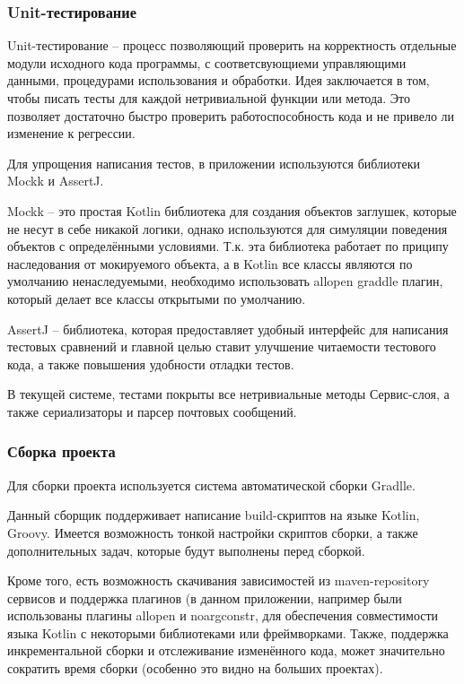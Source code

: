 \subsubsection{Unit-тестирование}\indent

Unit-тестирование – процесс позволяющий проверить на корректность отдельные модули исходного кода программы, с соответсвующиеми управляющими данными, процедурами использования и обработки. Идея заключается в том, чтобы писать тесты для каждой нетривиальной функции или метода. Это позволяет достаточно быстро проверить работоспособность кода и не привело ли изменение к регрессии.

Для упрощения написания тестов, в приложении используются библиотеки Mockk и AssertJ.

Mockk – это простая Kotlin библиотека для создания объектов заглушек, которые не несут в себе никакой логики, однако используются для симуляции поведения объектов с определёнными условиями. Т.к. эта библиотека работает по приципу наследования от мокируемого объекта, а в Kotlin все классы являются по умолчанию ненаследуемыми, необходимо использовать allopen graddle плагин, который делает все классы открытыми по умолчанию.

AssertJ – библиотека, которая предоставляет удобный интерфейс для написания тестовых сравнений и главной целью ставит улучшение читаемости тестового кода, а также повышения удобности отладки тестов.

В текущей системе, тестами покрыты все нетривиальные методы Сервис-слоя, а также сериализаторы и парсер почтовых сообщений.


\subsubsection{Сборка проекта}\indent

Для сборки проекта используется система автоматической сборки Gradlle.

Данный сборщик поддерживает написание build-скриптов на языке Kotlin, Groovy. Имеется возможность тонкой настройки скриптов сборки, а также дополнительных задач, которые будут выполнены перед сборкой.

Кроме того, есть возможность скачивания зависимостей из maven-repository сервисов и поддержка плагинов (в данном приложении, например были использованы плагины allopen и noargconstr, для обеспечения совместимости языка Kotlin с некоторыми библиотеками или фреймворками. Также, поддержка инкрементальной сборки и отслеживание изменённого кода, может значительно сократить время сборки (особенно это видно на больших проектах).
